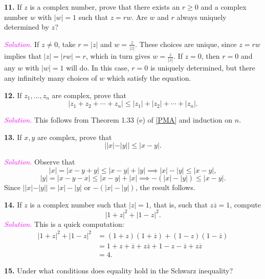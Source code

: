 \documentclass[12pt]{article}
\newcommand{\newp}{\vspace{5mm}}
\theoremstyle{definition}
\begin{document}
\newp

\textbf{11.} If \( z \) is a complex number, prove that there exists an \( r \geq 0 \) and a complex number \( w \) with \( |w| = 1 \) such that \( z = rw \). Are \( w \) and \( r \) always uniquely determined by \( z \)?

\newp

\textit{\textcolor{magenta}{Solution.}} If \( z \neq 0 \), take \( r = |z| \) and \( w = \frac{z}{|z|} \). These choices are unique, since \( z = rw \) implies that \( |z| = |rw| = r \), which in turn gives \( w = \frac{z}{|z|} \). If \( z = 0 \), then \( r = 0 \) and any \( w \) with \( |w| = 1 \) will do. In this case, \( r = 0 \) is uniquely determined, but there any infinitely many choices of \( w \) which satisfy the equation.

\newp

\textbf{12.} If \( z_1, \ldots, z_n \) are complex, prove that
\[
|z_1 + z_2 + \cdots + z_n | \leq |z_1| + |z_2| + \cdots + |z_n|.
\]

\newp

\textit{\textcolor{magenta}{Solution.}} This follows from Theorem 1.33 (e) of \hyperlink{pma}{[PMA]} and induction on \( n \).

\newp

\textbf{13.} If \( x, y \) are complex, prove that
\[
||x| - |y|| \leq |x - y|.
\]

\newp

\textit{\textcolor{magenta}{Solution.}} Observe that
\[
|x| = |x - y + y| \leq |x - y| + |y| \implies |x| - |y| \leq |x - y|,
\]
\[
|y| = |x - y - x| \leq |x - y| + |x| \implies -(|x| - |y|) \leq |x - y|.
\]
Since \( ||x| - |y|| = |x| - |y| \) or \( -(|x| - |y|) \), the result follows.

\newp

\textbf{14.} If \( z \) is a complex number such that \( |z| = 1 \), that is, such that \( z \overline{z} = 1 \), compute
\[
|1 + z|^2 + |1 - z|^2.
\]
\textit{\textcolor{magenta}{Solution.}} This is a quick computation:
\begin{align*}
|1 + z|^2 + |1 - z|^2 &= (1 + z)(1 + \overline{z}) + (1 - z)(1 - \overline{z}) \\
&= 1 + z + \overline{z} + z \overline{z} + 1 - z - \overline{z} + z \overline{z} \\
&= 4.
\end{align*}

\newp

\textbf{15.} Under what conditions does equality hold in the Schwarz inequality?
\end{document}
